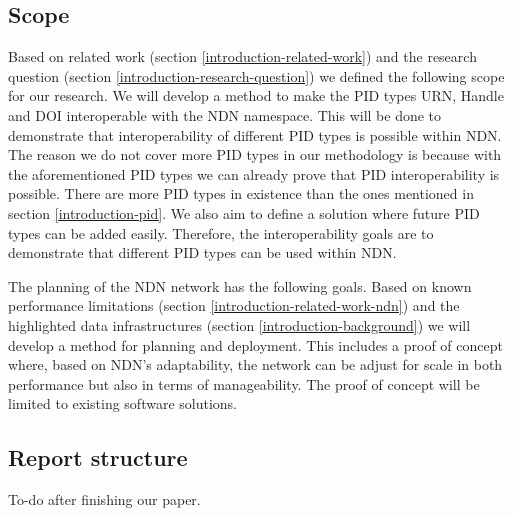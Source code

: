 \subsection{Scope}
\label{introduction-scope}

Based on related work (section \ref{introduction-related-work}) and the research question (section \ref{introduction-research-question}) we defined the following scope for our research. We will develop a method to make the PID types URN, Handle and DOI interoperable with the NDN namespace. This will be done to demonstrate that interoperability of different PID types is possible within NDN. The reason we do not cover more PID types in our methodology is because with the aforementioned PID types we can already prove that PID interoperability is possible. There are more PID types in existence than the ones mentioned in section \ref{introduction-pid}. We also aim to define a solution where future PID types can be added easily. Therefore, the interoperability goals are to demonstrate that different PID types can be used within NDN. 

The planning of the NDN network has the following goals. Based on known performance limitations (section \ref{introduction-related-work-ndn}) and the highlighted data infrastructures (section \ref{introduction-background}) we will develop a method for planning and deployment. This includes a proof of concept where, based on NDN's adaptability, the network can be adjust for scale in both performance but also in terms of manageability. The proof of concept will be limited to existing software solutions.

\subsection{Report structure}
To-do after finishing our paper.



